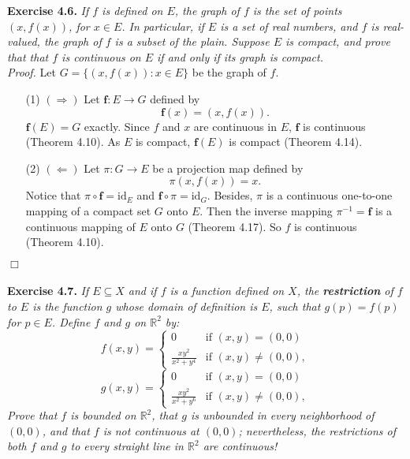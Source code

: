 \documentclass{article}
\begin{document}



\textbf{Exercise 4.6.}
\emph{If $f$ is defined on $E$, the graph of $f$ is the set of points $(x,f(x))$,
for $x \in E$.
In particular, if $E$ is a set of real numbers, and $f$ is real-valued,
the graph of $f$ is a subset of the plain.
Suppose $E$ is compact, and prove that that $f$ is continuous on $E$
if and only if its graph is compact.} \\

\emph{Proof.}
Let $G = \{ (x,f(x)) : x \in E\}$ be the graph of $f$.
\begin{enumerate}
\item[(1)]
$(\Longrightarrow)$
Let $\mathbf{f}: E \to G$ defined by
$$\mathbf{f}(x) = (x,f(x)).$$
$\mathbf{f}(E) = G$ exactly.
Since $f$ and $x$ are continuous in $E$, $\mathbf{f}$ is continuous (Theorem 4.10).
As $E$ is compact, $\mathbf{f}(E)$ is compact (Theorem 4.14).
\item[(2)]
$(\Longleftarrow)$
Let $\pi: G \to E$ be a projection map defined by
$$\pi(x, f(x)) = x.$$
Notice that $\pi \circ \mathbf{f} = \text{id}_E$ and
$\mathbf{f} \circ \pi = \text{id}_G$.
Besides,
$\pi$ is a continuous one-to-one mapping of a compact set $G$ onto $E$.
Then the inverse mapping $\pi^{-1} = \mathbf{f}$
is a continuous mapping of $E$ onto $G$ (Theorem 4.17).
So $f$ is continuous (Theorem 4.10).
\end{enumerate}
$\Box$ \\\\






\textbf{Exercise 4.7.}
\emph{If $E \subseteq X$ and if $f$ is a function defined on $X$,
the \textbf{restriction} of $f$ to $E$ is the function $g$ whose domain of definition is $E$,
such that $g(p) = f(p)$ for $p \in E$.
Define $f$ and $g$ on $\mathbb{R}^2$ by:}
\begin{equation*}
  f(x,y) =
  \begin{cases}
    0                    & \text{if $(x,y) = (0,0)$} \\
    \frac{xy^2}{x^2+y^4} & \text{if $(x,y) \neq (0,0)$},
  \end{cases}
\end{equation*}
\begin{equation*}
  g(x,y) =
  \begin{cases}
    0                    & \text{if $(x,y) = (0,0)$} \\
    \frac{xy^2}{x^2+y^6} & \text{if $(x,y) \neq (0,0)$},
  \end{cases}
\end{equation*}
\emph{Prove that $f$ is bounded on $\mathbb{R}^2$,
that $g$ is unbounded in every neighborhood of $(0,0)$,
and that $f$ is not continuous at $(0,0)$;
nevertheless, the restrictions of both $f$ and $g$ to every straight line
in $\mathbb{R}^2$ are continuous!} \\
\end{document}
